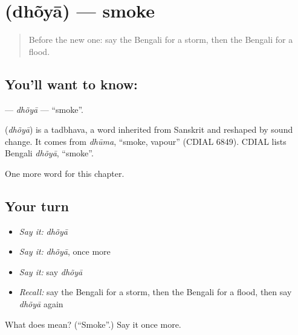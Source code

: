 \section[\texorpdfstring{\bn{ধোঁয়া} (dhõyā)}{ধোঁয়া (dhõyā)}]{ (dhõyā) — smoke}

\label{lesson:BN-C255-dhoya}



\begin{quote}
Before the new one: say the Bengali for a storm, then the Bengali for a flood.
\end{quote}

\subsection*{You'll want to know: }
\textbf{} — \emph{dhõyā} — \textquotedblleft{}smoke\textquotedblright{}.

\begin{cousinweb}
\textbf{} (\emph{dhõyā}) is a tadbhava, a word inherited from Sanskrit and reshaped by sound change. It comes from \emph{dhūma}, \textquotedblleft{}smoke, vapour\textquotedblright{} (CDIAL 6849). CDIAL lists Bengali \emph{dhõyā}, \textquotedblleft{}smoke\textquotedblright{}.
\end{cousinweb}

\begin{grammarlens}[title={What you've built}]
One more word for this chapter.
\end{grammarlens}

\subsection*{Your turn}
\begin{itemize}
\raggedright
  \item \emph{Say it:} \emph{dhõyā}
  \item \emph{Say it:} \emph{dhõyā}, once more
  \item \emph{Say it:} say \emph{dhõyā}
  \item \emph{Recall:} say the Bengali for a storm, then the Bengali for a flood, then say \emph{dhõyā} again
\end{itemize}

\begin{tcolorbox}[breakable,colback=teal!4,colframe=teal!35!black,title={Before you move on}]
What does  mean? (\textquotedblleft{}Smoke\textquotedblright{}.) Say it once more.
\end{tcolorbox}
